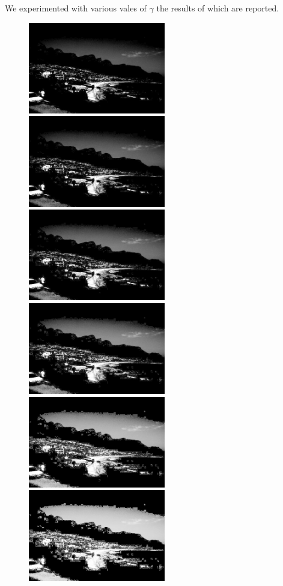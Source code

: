 \documentclass[paper=a4, fontsize=11pt]{scrartcl} %
\numberwithin{equation}{section} %
\numberwithin{figure}{section} %
\numberwithin{table}{section} %
\begin{document}
        We experimented with various vales of \(\gamma\) the results of which are reported.
        \begin{figure}[h!]
            \centering
            \includegraphics[clip,height=4cm]{gamma67}
            \includegraphics[clip,height=4cm]{gamma57}
            \includegraphics[clip,height=4cm]{gamma47}
            \includegraphics[clip,height=4cm]{gamma37}
            \includegraphics[clip,height=4cm]{gamma20}
            \includegraphics[clip,height=4cm]{gamma10}

\end{figure}
\end{document}
